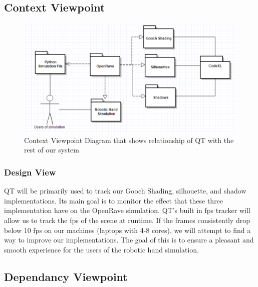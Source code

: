 \documentclass[10pt,journal,compsoc,draftclsnofoot]{IEEEtran}
\begin{document}
\begin{flushleft}
\subsection{Context Viewpoint}

\begin{figure} [H]
  \includegraphics[scale=0.9]{CodeXL_Context.eps}
  \caption
{ \newline \hspace{\linewidth}
Context Viewpoint Diagram that shows relationship of QT with the rest of our system}
  \label{fig:CodeXL_Context}
\end{figure}

\subsubsection{Design View}
QT will be primarily used to track our Gooch Shading, silhouette, and shadow implementations.
Its main goal is to monitor the effect that these three implementation have on the OpenRave simulation.
QT's built in fps tracker will allow us to track the fps of the scene at runtime.
If the frames consistently drop below 10 fps on our machines (laptops with 4-8 cores), we will attempt to find a way to improve our implementations.
The goal of this is to ensure a pleasant and smooth experience for the users of the robotic hand simulation.

\subsection{Dependancy Viewpoint}


\end{flushleft}
\end{document}

